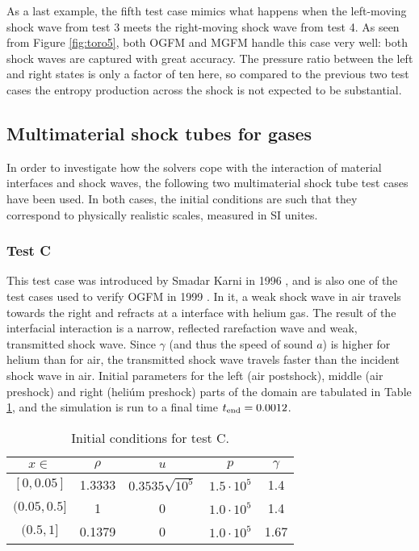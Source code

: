 \documentclass[final,3p,twocolumn]{elsarticle}
\begin{document}
As a last example, the fifth test case mimics what happens when the left-moving
shock wave from test 3 meets the right-moving shock wave from test 4. As seen
from Figure \ref{fig:toro5}, both OGFM and MGFM handle this case very well:
both shock waves are captured with great accuracy. The pressure ratio between
the left and right states is only a factor of ten here, so compared to the
previous two test cases the entropy production across the shock is not expected
to be substantial. 

\subsection{Multimaterial shock tubes for gases}
\label{subsec:shocktubes}

In order to investigate how the solvers cope with the interaction of material
interfaces and shock waves, the following two multimaterial shock tube test
cases have been used. In both cases, the initial conditions are such that they
correspond to physically realistic scales, measured in SI unites. 

\subsubsection{Test C}

This test case was introduced by Smadar Karni in 1996 \cite{karni1996hybrid},
and is also one of the test cases used to verify OGFM in 1999
\cite{fedkiw1999nonoscillatory}. In it, a weak shock wave in air travels
towards the right and refracts at a interface with helium gas. The result of
the interfacial interaction is a narrow, reflected rarefaction wave and weak,
transmitted shock wave. Since $\gamma$ (and thus the speed of sound $a$) is
higher for helium than for air, the transmitted shock wave travels faster than
the incident shock wave in air.  Initial parameters for the left (air
postshock), middle (air preshock) and right (heliúm preshock) parts of the
domain are tabulated in Table \ref{tab:testC}, and the simulation is run to a
final time $t_{\rm end}=0.0012$. 

\begin{table}[htb]
    \centering
    \begin{tabular}{ccccc}
        \hline
        $x \in $ & $\rho$ & $u$ & $p$ & $\gamma$ \\
        \hline
        $[0,0.05]$ & 1.3333 & $0.3535\sqrt{10^5}$ & $1.5\cdot 10^5$ & 1.4 \\
        $(0.05,0.5]$ & 1 & 0 & $1.0\cdot 10^5$ & 1.4 \\
        $(0.5,1]$ & 0.1379 & 0 & $1.0\cdot 10^5$ & 1.67 \\
        \hline
    \end{tabular}
    \caption{Initial conditions for test C.}
    \label{tab:testC}
\end{table}
\end{document}
